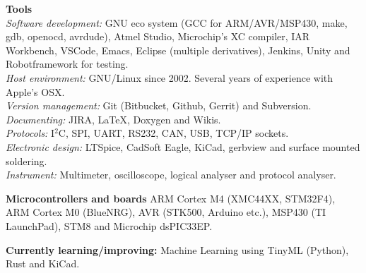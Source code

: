 \documentclass[a4paper,margin,line]{res} \usepackage{latexsym}
\begin{document}
\begin{resume}
{\bf Tools}\\ {\em Software development:} GNU eco system (GCC for
ARM/AVR/MSP430, make, gdb, openocd, avrdude), Atmel Studio,
Microchip's XC compiler, IAR Workbench, VSCode, Emacs, Eclipse
(multiple derivatives), Jenkins, Unity and Robotframework for testing.
\\ {\em Host environment:} GNU/Linux since 2002. Several years of
experience with Apple's OSX.\\ {\em Version management:} Git
(Bitbucket, Github, Gerrit) and Subversion. \\ {\em Documenting:}
JIRA, \LaTeX, Doxygen and Wikis. \\ {\em Protocols:} I$^2$C, SPI,
UART, RS232, CAN, USB, TCP/IP sockets.\\ {\em Electronic design:}
LTSpice, CadSoft Eagle, KiCad, gerbview and surface mounted
soldering. \\ {\em Instrument:} Multimeter, oscilloscope, logical
analyser and protocol analyser.


{\bf Microcontrollers and boards} ARM Cortex M4 (XMC44XX, STM32F4),
ARM Cortex M0 (Blue\-NRG), AVR (STK500, Arduino etc.), MSP430 (TI
LaunchPad), STM8 and Microchip dsPIC33EP.

{\bf Currently learning/improving:} Machine Learning using TinyML (Python), Rust and KiCad.






\end{resume}
\end{document}
